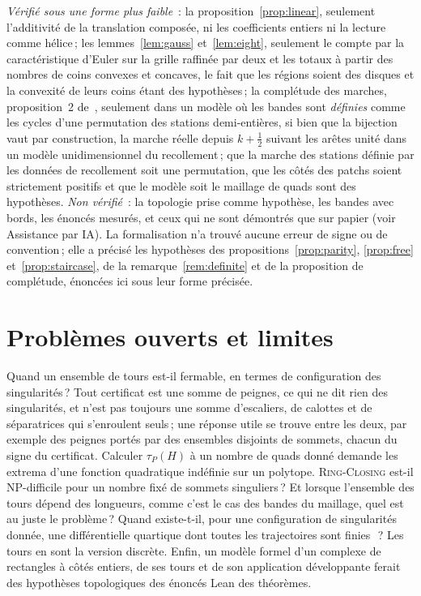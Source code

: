 \documentclass[11pt,a4paper]{article}
\newcommand{\RC}{\textup{\textsc{Ring-Closing}}}
\begin{document}
\emph{Vérifié sous une forme plus faible}~: la
proposition~\ref{prop:linear}, seulement l'additivité de la translation
composée, ni les coefficients entiers ni la lecture comme hélice\,; les
lemmes~\ref{lem:gauss} et~\ref{lem:eight}, seulement le compte par la
caractéristique d'Euler sur la grille raffinée par deux et les totaux à partir
des nombres de coins convexes et concaves, le fait que les régions soient des
disques et la convexité de leurs coins étant des hypothèses\,; la complétude
des marches, proposition~2 de~\cite{gardent2026loops}, seulement dans un
modèle où les bandes sont \emph{définies} comme les cycles d'une permutation
des stations demi-entières, si bien que la bijection vaut par construction, la
marche réelle depuis $k + \frac12$ suivant les arêtes unité dans un modèle
unidimensionnel du recollement\,; que la marche des stations définie par les
données de recollement soit une permutation, que les côtés des patchs soient
strictement positifs et que le modèle soit le maillage de quads sont des
hypothèses. \emph{Non vérifié}~: la topologie prise comme hypothèse, les
bandes avec bords, les énoncés mesurés, et ceux qui ne sont démontrés que sur
papier (voir Assistance par IA). La formalisation n'a trouvé aucune erreur de
signe ou de convention\,; elle a précisé les hypothèses des
propositions~\ref{prop:parity}, \ref{prop:free} et~\ref{prop:staircase}, de
la remarque~\ref{rem:definite} et de la proposition de complétude, énoncées
ici sous leur forme précisée.

\section{Problèmes ouverts et limites}\label{sec:open}

Quand un ensemble de tours est-il fermable, en termes de configuration des
singularités\,? Tout certificat est une somme de peignes, ce qui ne dit rien
des singularités, et n'est pas toujours une somme d'escaliers, de calottes et
de séparatrices qui s'enroulent seuls\,; une réponse utile se trouve entre les
deux, par exemple des peignes portés par des ensembles disjoints de sommets,
chacun du signe du certificat. Calculer $\tau_P(H)$ à un nombre de quads donné
demande les extrema d'une fonction quadratique indéfinie sur un polytope.
\RC{} est-il NP-difficile pour un nombre fixé de sommets singuliers\,? Et
lorsque l'ensemble des tours dépend des longueurs, comme c'est le cas des
bandes du maillage, quel est au juste le problème\,? Quand existe-t-il, pour
une configuration de singularités donnée, une différentielle quartique dont
toutes les trajectoires sont finies~\cite{lei2020quartic}\,? Les tours en sont
la version discrète. Enfin, un modèle formel d'un complexe de rectangles à
côtés entiers, de ses tours et de son application développante ferait des
hypothèses topologiques des énoncés Lean des théorèmes.
\end{document}

